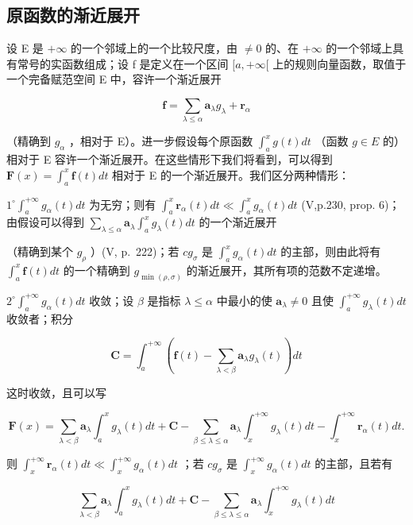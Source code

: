 \subsection{原函数的渐近展开}

设 E 是 \(+\infty\) 的一个邻域上的一个比较尺度，由 \(\neq 0\) 的、在 \(+\infty\) 的一个邻域上具有常号的实函数组成；设 f 是定义在一个区间 \([a, +\infty[\) 上的规则向量函数，取值于一个完备赋范空间 E 中，容许一个渐近展开

\[
\mathbf {f} = \sum_ {\lambda \leqslant \alpha} \mathbf {a} _ {\lambda} g _ {\lambda} + \mathbf {r} _ {\alpha}
\]

（精确到 \(g_{\alpha}\) ，相对于 E）。进一步假设每个原函数 \(\int_{a}^{x} g(t) dt\) （函数 \(g \in E\) 的）相对于 E 容许一个渐近展开。在这些情形下我们将看到，可以得到 \(\mathbf{F}(x) = \int_{a}^{x} \mathbf{f}(t) dt\) 相对于 E 的一个渐近展开。我们区分两种情形：

\(1^{\circ}\int_{a}^{+\infty}g_{\alpha}(t)dt\) 为无穷；则有 \(\int_{a}^{x}\mathbf{r}_{\alpha}(t)dt\ll \int_{a}^{x}g_{\alpha}(t)dt\) (V,p.230, prop. 6)；由假设可以得到 \(\sum_{\lambda \leqslant \alpha}\mathbf{a}_{\lambda}\int_{a}^{x}g_{\lambda}(t)dt\) 的一个渐近展开

（精确到某个 \(g_{\rho}\) ）(V, p.~222)；若 \(cg_{\sigma}\) 是 \(\int_{a}^{x} g_{\alpha}(t) dt\) 的主部，则由此将有 \(\int_{a}^{x} \mathbf{f}(t) dt\) 的一个精确到 \(g_{\min(\rho, \sigma)}\) 的渐近展开，其所有项的范数不定递增。

\(2^{\circ}\int_{a}^{+\infty}g_{\alpha}(t)dt\) 收敛；设 \(\beta\) 是指标 \(\lambda \leqslant \alpha\) 中最小的使 \(\mathbf{a}_{\lambda}\neq 0\) 且使 \(\int_{a}^{+\infty}g_{\lambda}(t)dt\) 收敛者；积分

\[
\mathbf {C} = \int_ {a} ^ {+ \infty} \left(\mathbf {f} (t) - \sum_ {\lambda <   \beta} \mathbf {a} _ {\lambda} g _ {\lambda} (t)\right) d t
\]

这时收敛，且可以写

\[
\mathbf {F} (x) = \sum_ {\lambda <   \beta} \mathbf {a} _ {\lambda} \int_ {a} ^ {x} g _ {\lambda} (t) d t + \mathbf {C} - \sum_ {\beta \leqslant \lambda \leqslant \alpha} \mathbf {a} _ {\lambda} \int_ {x} ^ {+ \infty} g _ {\lambda} (t) d t - \int_ {x} ^ {+ \infty} \mathbf {r} _ {\alpha} (t) d t.
\]

则 \(\int_{x}^{+\infty}\mathbf{r}_{\alpha}(t)dt\ll \int_{x}^{+\infty}g_{\alpha}(t)dt\) ；若 \(cg_{\sigma}\) 是 \(\int_{x}^{+\infty}g_{\alpha}(t)dt\) 的主部，且若有

\[
\sum_ {\lambda <   \beta} \mathbf {a} _ {\lambda} \int_ {a} ^ {x} g _ {\lambda} (t) d t + \mathbf {C} - \sum_ {\beta \leqslant \lambda \leqslant \alpha} \mathbf {a} _ {\lambda} \int_ {x} ^ {+ \infty} g _ {\lambda} (t) d t
\]

